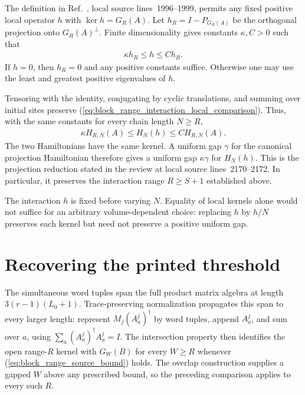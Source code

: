 \documentclass{article}
\begin{document}
The definition in Ref.~\cite[Section~IV.C]{Cirac2021Matrix}, local source
lines~1996--1999, permits any fixed positive local operator $h$ with
$\ker h=G_R(A)$. Let $h_R=I-P_{G_R(A)}$ be the orthogonal projection onto
$G_R(A)^\perp$. Finite dimensionality gives constants $\kappa,C>0$ such that
\begin{align}
    \kappa h_R\leq h\leq Ch_R.
    \label{eq:block_range_interaction_local_comparison}
\end{align}
If $h=0$, then $h_R=0$ and any positive constants suffice. Otherwise one may
use the least and greatest positive eigenvalues of $h$.

Tensoring with the identity, conjugating by cyclic translations, and summing
over initial sites preserve (\ref{eq:block_range_interaction_local_comparison}).
Thus, with the same constants for every chain length $N\geq R$,
\begin{align}
    \kappa H_{R,N}(A)\leq H_N(h)\leq C H_{R,N}(A).
    \label{eq:block_range_interaction_periodic_comparison}
\end{align}
The two Hamiltonians have the same kernel. A uniform gap $\gamma$ for the
canonical projection Hamiltonian therefore gives a uniform gap
$\kappa\gamma$ for $H_N(h)$. This is the projection reduction stated in the
review at local source lines~2170--2172. In particular, it preserves the
interaction range $R\geq S+1$ established above.

The interaction $h$ is fixed before varying $N$. Equality of local kernels
alone would not suffice for an arbitrary volume-dependent choice: replacing
$h$ by $h/N$ preserves each kernel but need not preserve a positive uniform gap.

\section{Recovering the printed threshold}

The simultaneous word tuples span the full product matrix algebra at length
$3(r-1)(L_0+1)$. Trace-preserving normalization propagates this span to every
larger length: represent $M_j(A^j_a)^\dagger$ by word tuples, append $A^j_a$,
and sum over $a$, using $\sum_a(A^j_a)^\dagger A^j_a=I$.
The intersection property then identifies the open range-$R$ kernel with
$G_W(B)$ for every $W\geq R$ whenever (\ref{eq:block_range_source_bound}) holds.
The overlap construction supplies a gapped $W$ above any prescribed bound,
so the preceding comparison applies to every such $R$.
\end{document}
